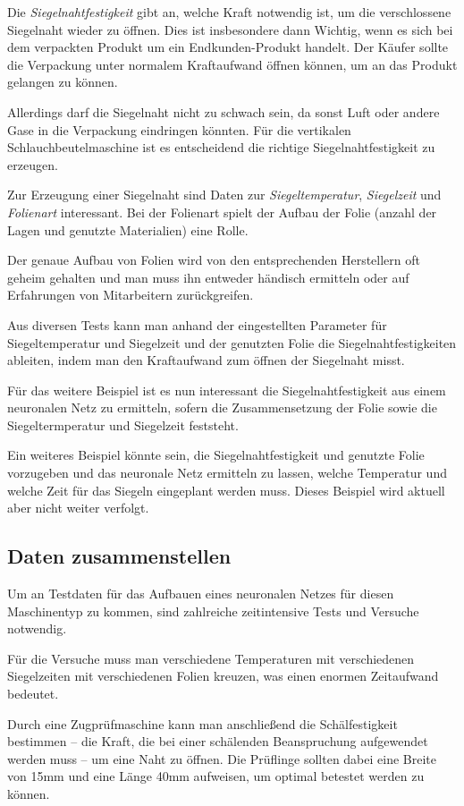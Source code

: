 Die \textit{Siegelnahtfestigkeit} gibt an, welche Kraft notwendig ist, um die verschlossene Siegelnaht wieder zu öffnen.
Dies ist insbesondere dann Wichtig, wenn es sich bei dem verpackten Produkt um ein Endkunden-Produkt handelt. Der Käufer
sollte die Verpackung unter normalem Kraftaufwand öffnen können, um an das Produkt gelangen zu können.

Allerdings darf die Siegelnaht nicht zu schwach sein, da sonst Luft oder andere Gase in die Verpackung eindringen
könnten. Für die vertikalen Schlauchbeutelmaschine ist es entscheidend die richtige Siegelnahtfestigkeit zu erzeugen.

Zur Erzeugung einer Siegelnaht sind Daten zur \textit{Siegeltemperatur}, \textit{Siegelzeit} und \textit{Folienart}
interessant. Bei der Folienart spielt der Aufbau der Folie (anzahl der Lagen und genutzte Materialien) eine Rolle.

Der genaue Aufbau von Folien wird von den entsprechenden Herstellern oft geheim gehalten und man muss ihn entweder
händisch ermitteln oder auf Erfahrungen von Mitarbeitern zurückgreifen.

Aus diversen Tests kann man anhand der eingestellten Parameter für Siegeltemperatur und Siegelzeit und der genutzten
Folie die Siegelnahtfestigkeiten ableiten, indem man den Kraftaufwand zum öffnen der Siegelnaht misst.

Für das weitere Beispiel ist es nun interessant die Siegelnahtfestigkeit aus einem neuronalen Netz zu ermitteln, sofern
die Zusammensetzung der Folie sowie die Siegeltermperatur und Siegelzeit feststeht.

Ein weiteres Beispiel könnte sein, die Siegelnahtfestigkeit und genutzte Folie vorzugeben und das neuronale Netz
ermitteln zu lassen, welche Temperatur und welche Zeit für das Siegeln eingeplant werden muss. Dieses Beispiel wird
aktuell aber nicht weiter verfolgt.

\subsection{Daten zusammenstellen}
Um an Testdaten für das Aufbauen eines neuronalen Netzes für diesen Maschinentyp zu kommen, sind zahlreiche
zeitintensive Tests und Versuche notwendig.

Für die Versuche muss man verschiedene Temperaturen mit verschiedenen Siegelzeiten mit verschiedenen Folien kreuzen, was
einen enormen Zeitaufwand bedeutet.

Durch eine Zugprüfmaschine kann man anschließend die Schälfestigkeit bestimmen -- die Kraft, die bei einer schälenden
Beanspruchung aufgewendet werden muss -- um eine Naht zu öffnen. Die Prüflinge sollten dabei eine Breite von 15mm und
eine Länge 40mm aufweisen, um optimal betestet werden zu können.

